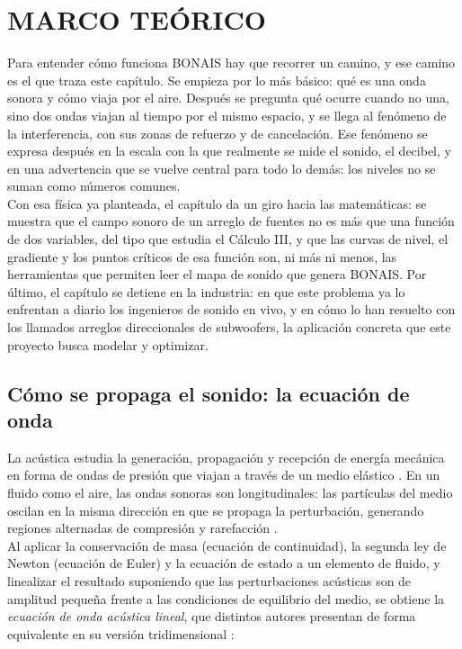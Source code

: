 \chapter{MARCO TEÓRICO}


Para entender cómo funciona BONAIS hay que recorrer un camino, y ese
camino es el que traza este capítulo. Se empieza por lo más básico:
qué es una onda sonora y cómo viaja por el aire. Después se pregunta
qué ocurre cuando no una, sino dos ondas viajan al tiempo por el mismo
espacio, y se llega al fenómeno de la interferencia, con sus zonas de
refuerzo y de cancelación. Ese fenómeno se expresa después en la
escala con la que realmente se mide el sonido, el decibel, y en una
advertencia que se vuelve central para todo lo demás: los niveles no
se suman como números comunes.\\

\noindent Con esa física ya planteada, el capítulo da un giro hacia las
matemáticas: se muestra que el campo sonoro de un arreglo de fuentes
no es más que una función de dos variables, del tipo que estudia el
Cálculo III, y que las curvas de nivel, el gradiente y los puntos
críticos de esa función son, ni más ni menos, las herramientas que
permiten leer el mapa de sonido que genera BONAIS. Por último, el
capítulo se detiene en la industria: en que este problema ya lo
enfrentan a diario los ingenieros de sonido en vivo, y en cómo lo han
resuelto con los llamados arreglos direccionales de subwoofers, la
aplicación concreta que este proyecto busca modelar y optimizar.

\section{Cómo se propaga el sonido: la ecuación de onda}

La acústica estudia la generación, propagación y recepción de energía
mecánica en forma de ondas de presión que viajan a través de un medio
elástico \cite{kinsler2000,rossing2014handbook}. En un fluido como el
aire, las ondas sonoras son longitudinales: las partículas del medio
oscilan en la misma dirección en que se propaga la perturbación,
generando regiones alternadas de compresión y rarefacción
\cite{kinsler2000}.\\

\noindent Al aplicar la conservación de masa (ecuación de continuidad), la
segunda ley de Newton (ecuación de Euler) y la ecuación de estado a un
elemento de fluido, y linealizar el resultado suponiendo que las
perturbaciones acústicas son de amplitud pequeña frente a las
condiciones de equilibrio del medio, se obtiene la \emph{ecuación de
onda acústica lineal}, que distintos autores presentan de forma
equivalente en su versión tridimensional
\cite{kinsler2000,rossing2014handbook,pierce2014handbook}:

